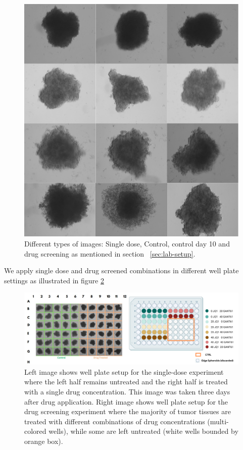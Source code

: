 \begin{figure}[H]
  \centering
  \includegraphics[scale=0.4]{figures/types.png} 
  \caption{Different types of images: Single dose, Control, control day 10 and drug screening as mentioned in section ~\ref{sec:lab-setup}.}
  \label{fig:Types}
\end{figure}

We apply single dose and drug screened combinations in different well plate settings as illustrated in figure \ref{fig:wellplate setup}

\begin{figure}[H]
  \centering
  \includegraphics[width=0.9\linewidth]{figures/well.png} %
  \caption{Left image shows well plate setup for the single-dose experiment where the left half remains untreated and the right half is treated with a single drug concentration. This image was taken three days after drug application. Right image shows well plate setup for the drug screening experiment where the majority of tumor tissues are treated with different combinations of drug 
  concentrations (multi-colored wells), while some are left untreated (white wells bounded by orange box).}
  \label{fig:wellplate setup}
\end{figure}



